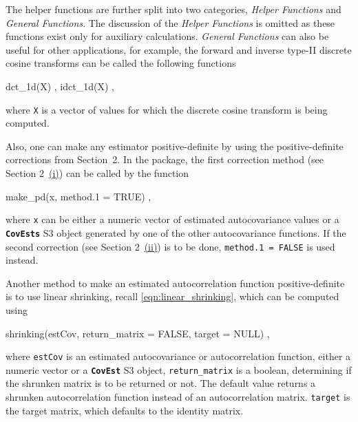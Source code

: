 The helper functions are further split into two categories, \textit{Helper Functions} and \textit{General Functions}. %
The discussion of the \textit{Helper Functions} is omitted as these functions exist only for auxiliary calculations. %
\textit{General Functions} can also be useful for other applications, for example, the forward and inverse type-II discrete cosine transforms can be called the following functions
\begin{example}
dct_1d(X) ,
idct_1d(X) ,
\end{example}
where \texttt{X} is a vector of values for which the discrete cosine transform is being computed.


Also, one can make any estimator positive-definite by using the positive-definite corrections from Section~2. %
In the package, the first correction method (see Section 2~\hyperref[make_pos_def_1]{(i)}) can be called by the function
\begin{example}
make_pd(x, method.1 = TRUE) ,
\end{example}
where \texttt{x} can be either a numeric vector of estimated autocovariance values or a \textbf{\texttt{CovEsts}} S3 object generated by one of the other autocovariance functions. If the second correction (see Section 2~\hyperref[make_pos_def_2]{(ii)}) is to be done, \texttt{method.1 = FALSE} is used instead.

Another method to make an estimated autocorrelation function positive-definite is to use linear shrinking, recall \eqref{eqn:linear_shrinking}, which can be computed using
\begin{example}
shrinking(estCov, return_matrix = FALSE, target = NULL) ,
\end{example}
where \texttt{estCov} is an estimated autocovariance or autocorrelation function, either a numeric vector or a \textbf{\texttt{CovEst}} S3 object, \texttt{return\_matrix} is a boolean, determining if the shrunken matrix is to be returned or not. The default value returns a shrunken autocorrelation function instead of an autocorrelation matrix. \texttt{target} is the target matrix, which defaults to the identity matrix.

